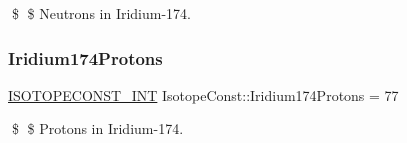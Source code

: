 \$ \$ Neutrons in Iridium-\/174. \mbox{\label{group___isotope_const-_iridium-_ir174_ga644291d6896616ebb1c022f2d0fcc0dd}} 
\subsubsection{\texorpdfstring{Iridium174\+Protons}{Iridium174Protons}}
{\footnotesize\ttfamily \mbox{\hyperlink{group___isotope_const-_macros_ga5f18360b3e99483a35c32d789e62621c}{I\+S\+O\+T\+O\+P\+E\+C\+O\+N\+S\+T\+\_\+\+I\+NT}} Isotope\+Const\+::\+Iridium174\+Protons = 77}

\$ \$ Protons in Iridium-\/174. 
